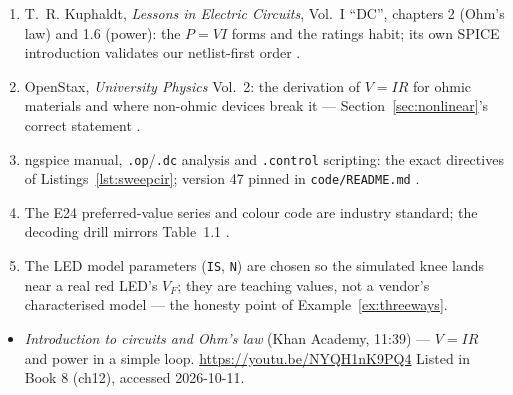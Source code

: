 \chapternotes

\begin{enumerate}
\item T.~R. Kuphaldt, \emph{Lessons in Electric Circuits}, Vol.~I ``DC'',
chapters 2 (Ohm's law) and 1.6 (power): the $P=VI$ forms and the ratings
habit; its own SPICE introduction validates our netlist-first order
\cite{aacvol1}.
\item OpenStax, \emph{University Physics} Vol.~2: the derivation of
$V=IR$ for ohmic materials and where non-ohmic devices break it —
Section~\ref{sec:nonlinear}'s correct statement \cite{openstaxv2}.
\item ngspice manual, \texttt{.op}/\texttt{.dc} analysis and \texttt{.control}
scripting: the exact directives of Listings~\ref{lst:sweepcir}; version 47
pinned in \texttt{code/README.md} \cite{ngspice}.
\item The E24 preferred-value series and colour code are industry standard;
the decoding drill mirrors Table~1.1 \cite{aacvol1}.
\item The LED model parameters (\texttt{IS}, \texttt{N}) are chosen so the
simulated knee lands near a real red LED's $V_F$; they are teaching values,
not a vendor's characterised model — the honesty point of
Example~\ref{ex:threeways}.
\end{enumerate}

\begin{rulebox}
\begin{itemize}
\item \emph{Introduction to circuits and Ohm's law} (Khan Academy, 11:39) --- $V = IR$ and power in a simple loop. \url{https://youtu.be/NYQH1nK9PQ4} Listed in Book 8 (ch12), accessed 2026-10-11.
\end{itemize}
\end{rulebox}

